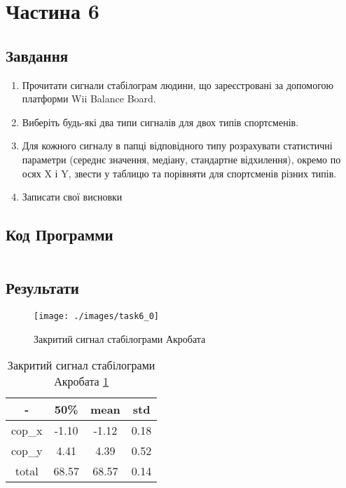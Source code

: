 \section{Частина 6}
\label{sec:task6}

\subsection{Завдання}
\label{subsec:task6_task}

\begin{enumerate}
    \item
          Прочитати сигнали стабілограм людини,
          що зареєстровані за допомогою платформи Wii Balance Board. \\

    \item
          Виберіть будь-які два типи сигналів для двох типів спортсменів.

    \item
          Для кожного сигналу в папці відповідного типу розрахувати статистичні
          параметри (середнє значення, медіану, стандартне відхилення),
          окремо по осях X і Y, звести у таблицю та порівняти
          для спортсменів різних типів.

    \item
          Записати свої висновки
\end{enumerate}

\subsection{Код Программи}
\label{subsec:task6_code}
\inputminted{python}{../src/task6.py}

\subsection{Результати}
\label{subsec:task6_results}

\begin{figure}[!ht]
    \centering
    \texttt{[image: ./images/task6\_0]}
    \caption{Закритий сигнал стабілограми Акробата}
    \label{fig:acrobats_base_close}
\end{figure}

\begin{table}[!ht]
    \centering
    \caption{Закритий сигнал стабілограми Акробата \ref{fig:acrobats_base_close}}
    \label{tab:acrobats_base_close}

    \begin{tabular}{|c|c|c|c|}
        \toprule
        -      & 50\%  & mean  & std  \\

        \midrule
        cop\_x & -1.10 & -1.12 & 0.18 \\
        \hline
        cop\_y & 4.41  & 4.39  & 0.52 \\

        \bottomrule
        total  & 68.57 & 68.57 & 0.14 \\
        \hline
    \end{tabular}
\end{table}

